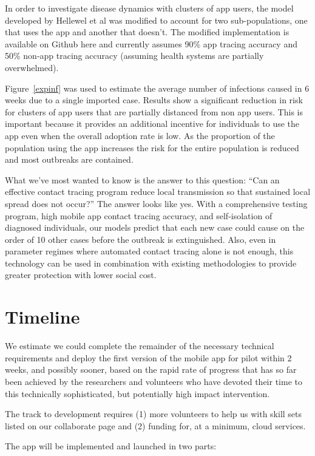\documentclass[11pt]{article}
\begin{document}
In order to investigate disease dynamics with clusters of app users, the model developed by Hellewel et al was modified to account for two sub-populations, one that uses the app and another that doesn’t. The modified implementation is available on Github here and currently assumes 90\% app tracing accuracy and 50\% non-app tracing accuracy (assuming health systems are partially overwhelmed).

Figure~\ref{expinf} was used to estimate the average number of infections caused in 6 weeks due to a single imported case. Results show a significant reduction in risk for clusters of app users that are partially distanced from non app users. This is important because it provides an additional incentive for individuals to use the app even when the overall adoption rate is low. As the proportion of the population using the app increases the risk for the entire population is reduced and most outbreaks are contained. 



What we’ve most wanted to know is the answer to this question: ``Can an effective contact tracing program reduce local transmission so that sustained local spread does not occur?'' The answer looks like yes.
With a comprehensive testing program, high mobile app contact tracing accuracy, and self-isolation of diagnosed individuals, our models predict that each new case could cause on the order of 10 other cases before the outbreak is extinguished. 
Also, even in parameter regimes where automated contact tracing alone is not enough, this technology can be used in combination with existing methodologies to provide greater protection with lower social cost.


\section{Timeline}

We estimate we could complete the remainder of the necessary technical requirements and deploy the first version of the mobile app for pilot within 2 weeks, and possibly sooner, based on the rapid rate of progress that has so far been achieved by the researchers and volunteers who have devoted their time to this technically sophisticated, but potentially high impact intervention. 

The track to development requires (1) more volunteers to help us with skill sets listed on our collaborate page and (2) funding for, at a minimum, cloud services.

The app will be implemented and launched in two parts:
\end{document}
